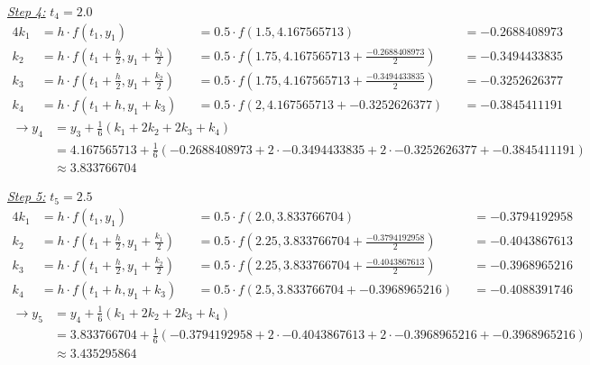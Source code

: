 \documentclass[a4paper]{article}
\numberwithin{equation}{section}
\begin{document}
\underline{\textit{Step 4:}} \(t_4=2.0\)
\begin{alignat*}{4}
  k_1 & = h\cdot f(t_1, y_1)                                            &  & = 0.5\cdot f(1.5,4.167565713)                    &  & = -0.2688408973               \\
  k_2 & = h\cdot f \left(t_1 + \frac{h}{2}, y_1 + \frac{k_1}{2}\right) &  & = 0.5\cdot f(1.75, 4.167565713+\frac{-0.2688408973 }{2})                  &  & = -0.3494433835              \\
  k_3 & = h\cdot f \left(t_1 + \frac{h}{2}, y_1 + \frac{k_2}{2}\right) &  & = 0.5\cdot f(1.75, 4.167565713+\frac{-0.3494433835}{2})               &  & = -0.3252626377 \\
  k_4 & = h\cdot f(t_1 + h, y_1 + k_3)                                 &  & = 0.5\cdot f(2, 4.167565713+-0.3252626377) &  & = -0.3845411191
\end{alignat*}
\begin{align*}
     \rightarrow y_4 & = y_3 + \frac{1}{6}(k_1 + 2k_2 + 2k_3 + k_4)                                                             \\
       &= 4.167565713 + \frac{1}{6} \left(-0.2688408973 + 2 \cdot -0.3494433835    + 2 \cdot  -0.3252626377 + -0.3845411191\right) \\               
      & \approx 3.833766704
\end{align*}

\underline{\textit{Step 5:}} \(t_5=2.5\)
\begin{alignat*}{4}
  k_1 & = h\cdot f(t_1, y_1)                                            &  & = 0.5\cdot f(2.0,3.833766704)                    &  & = -0.3794192958               \\
  k_2 & = h\cdot f \left(t_1 + \frac{h}{2}, y_1 + \frac{k_1}{2}\right) &  & = 0.5\cdot f(2.25, 3.833766704+\frac{-0.3794192958   }{2})                  &  & = -0.4043867613              \\
  k_3 & = h\cdot f \left(t_1 + \frac{h}{2}, y_1 + \frac{k_2}{2}\right) &  & = 0.5\cdot f(2.25, 3.833766704+\frac{-0.4043867613}{2})               &  & = -0.3968965216 \\
  k_4 & = h\cdot f(t_1 + h, y_1 + k_3)                                 &  & = 0.5\cdot f(2.5, 3.833766704+-0.3968965216) &  & = -0.4088391746
\end{alignat*}
\begin{align*}
     \rightarrow y_5 & = y_4 + \frac{1}{6}(k_1 + 2k_2 + 2k_3 + k_4)                                                             \\
       &= 3.833766704 + \frac{1}{6} \left(-0.3794192958 + 2 \cdot -0.4043867613    + 2 \cdot  -0.3968965216 + -0.3968965216\right) \\               
      & \approx 3.435295864
\end{align*}
\end{document}
